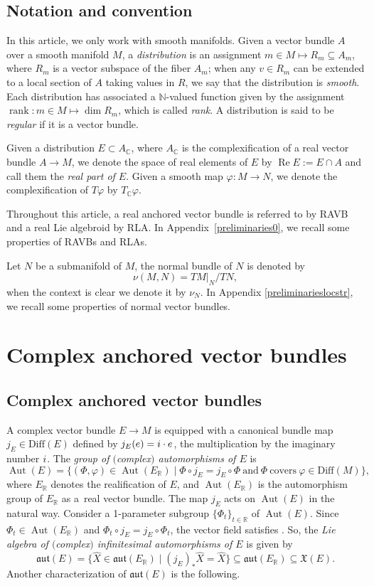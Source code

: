 \documentclass[11pt]{article}
\numberwithin{equation}{section}
\numberwithin{equation}{section}
\newcommand{\R}{{\mathbb{R}}}
\newcommand{\C}{{\mathbb{C}}}
\newcommand{\Diff}{\mathrm{Diff}}
\newcommand{\aut}{\mathfrak{aut}}
\DeclareMathOperator{\Aut}{Aut}
\DeclareMathOperator{\re}{Re}
\DeclareMathOperator{\rk}{rank}
\begin{document}
\subsection*{Notation and convention}
In this article, we only work with smooth manifolds. Given a vector bundle $A$ over a smooth manifold $M$, a {\em distribution} is an assignment $m\in M\mapsto R_m\subseteq A_m$, where $R_m$ is a vector subspace of the fiber $A_m$; when any $v\in R_m$ can be extended to a local section of $A$ taking values in $R$, we say that the distribution is {\em smooth}. Each distribution has associated a $\mathbb{N}$-valued function given by the assignment $\rk\colon m\in M\mapsto\dim R_m$, which is called {\em rank}. A distribution is said to be {\em regular} if it is a vector bundle.

Given a distribution $E\subset A_\C$, where $A_{\C}$ is the complexification of a real vector bundle $A\to M$, we denote the space of real elements of $E$ by $\re E:=E\cap A$ and call them the {\em real part of $E$}. Given a smooth map $\varphi\colon M\to N$, we denote the complexification of $T\varphi$ by $T_{\C}\varphi$.

Throughout this article, a real anchored vector bundle is referred to by RAVB and a real Lie algebroid by RLA. In Appendix~\ref{preliminaries0}, we recall some properties of RAVBs and RLAs.

Let $N$ be a submanifold of $M$, the normal bundle of $N$ is denoted by
\[
\nu(M,N)=TM|_{N}/TN,
\]
when the context is clear we denote it by $\nu_N$. In Appendix \ref{preliminarieslocstr}, we recall some properties of normal vector bundles.

\section{Complex anchored vector bundles}\label{CAVB}
\subsection{Complex anchored vector bundles}
A complex vector bundle $E\to M$ is equipped with a canonical bundle map $j_E\in \Diff(E)$ defined by $j_E(e)={\rm i}\cdot e$, the multiplication by the imaginary number ${\rm i}$. The {\em group of $($complex$)$ automorphisms of $E$} is
 \[
 \Aut(E)=\{(\Phi,\varphi)\in \Aut(E_{\R})\mid \Phi\circ j_E=j_E \circ \Phi\ \text{and}\ \Phi\ \text{covers}\ \varphi\in \Diff(M)\},
 \]
 where $E_{\R}$ denotes the realification of $E$, and $\Aut(E_{\R})$ is the automorphism group of $E_{\R}$ as a~real vector bundle.
The map $j_E$ acts on $\Aut(E)$ in the natural way. Consider a 1-parameter subgroup $\{\Phi_t\}_{t\in \R}$ of $\Aut(E)$. Since $\Phi_t\in \Aut(E_{\R})$ and $\Phi_t\circ j_E=j_E\circ \Phi_t$, the vector field \smash{$\hat{X}=\frac{{\rm d}}{{\rm d}t}\Phi_t|_{t=0}\in \mathfrak{aut}(E_{\R})$} satisfies . So, the {\em Lie algebra of $($complex$)$ infinitesimal automorphisms of $E$} is given by
 \[\mathfrak{aut}(E)=\bigl\{\hat{X}\in \mathfrak{aut}(E_{\R})\mid (j_E)_* \hat{X}=\hat{X}\bigr\}\subseteq \mathfrak{aut}(E_{\R})\subseteq \mathfrak{X}(E).\]
 Another characterization of $\aut(E)$ is the following.
\end{document}
